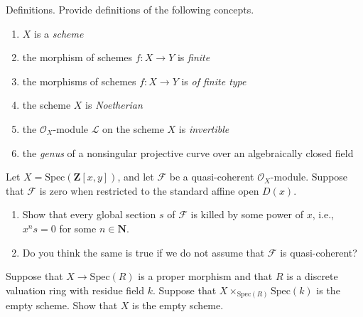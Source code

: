 \begin{exercise}
\label{exercise-definitions}
Definitions. Provide definitions of the following concepts.
\begin{enumerate}
\item $X$ is a {\it scheme}
\item the morphism of schemes $f : X \to Y$ is {\it finite}
\item the morphisms of schemes $f : X \to Y$ is {\it of finite type}
\item the scheme $X$ is {\it Noetherian}
\item the ${\mathcal O}_X$-module ${\mathcal L}$ on
the scheme $X$ is {\it invertible}
\item the {\it genus} of a nonsingular
projective curve over an algebraically closed field
\end{enumerate}
\end{exercise}

\begin{exercise}
\label{exercise-kill-global-sections}
Let $X = \text{Spec}({\mathbf Z}[x, y])$, and let ${\mathcal F}$ be a
quasi-coherent
${\mathcal O}_X$-module. Suppose that ${\mathcal F}$ is zero when restricted to
the
standard affine open $D(x)$.
\begin{enumerate}
\item Show that every global section $s$ of ${\mathcal F}$ is killed by some
power of $x$, i.e., $x^ns = 0$ for some $n\in {\mathbf N}$.
\item Do you think the same is true if we do not assume that ${\mathcal F}$
is quasi-coherent?
\end{enumerate}
\end{exercise}

\begin{exercise}
\label{exercise-empty-fibre-empty}
Suppose that $X \to \text{Spec}(R)$ is a proper morphism and that
$R$ is a discrete valuation ring with residue field $k$. Suppose that
$X \times_{\text{Spec}(R)} \text{Spec}(k)$ is the empty scheme. Show that
$X$ is the empty scheme.
\end{exercise}

